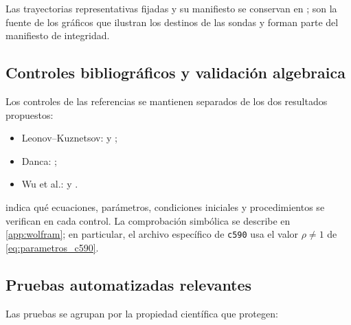 Las trayectorias representativas fijadas y su manifiesto se conservan en
;
son la fuente de los gráficos que ilustran los destinos de las sondas y forman
parte del manifiesto de integridad.

\subsection{Controles bibliográficos y validación algebraica}

Los controles de las referencias se mantienen separados de los dos resultados
propuestos:

\begin{itemize}
  \item Leonov--Kuznetsov:
  y ;
  \item Danca:
  ;
  \item Wu et al.:
  y
  .
\end{itemize}

 indica qué
ecuaciones, parámetros, condiciones iniciales y procedimientos se verifican
en cada control. La comprobación simbólica se describe en
\cref{app:wolfram}; en particular, el archivo específico de
\texttt{c590} usa el valor \(\rho\neq1\) de \cref{eq:parametros_c590}.

\subsection{Pruebas automatizadas relevantes}

Las pruebas se agrupan por la propiedad científica que protegen:

